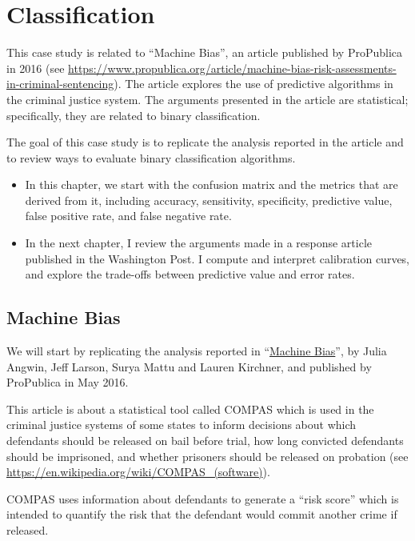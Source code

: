 \hypertarget{classification}{%
\chapter{Classification}\label{classification}}

This case study is related to ``Machine Bias'', an article published by
ProPublica in 2016 (see
\url{https://www.propublica.org/article/machine-bias-risk-assessments-in-criminal-sentencing}).
The article explores the use of predictive algorithms in the criminal
justice system. The arguments presented in the article are statistical;
specifically, they are related to binary classification.

The goal of this case study is to replicate the analysis reported in the
article and to review ways to evaluate binary classification algorithms.

\begin{itemize}
\item
  In this chapter, we start with the confusion matrix and the metrics
  that are derived from it, including accuracy, sensitivity,
  specificity, predictive value, false positive rate, and false negative
  rate.
\item
  In the next chapter, I review the arguments made in a response article
  published in the Washington Post. I compute and interpret calibration
  curves, and explore the trade-offs between predictive value and error
  rates.
\end{itemize}

\hypertarget{machine-bias}{%
\section{Machine Bias}\label{machine-bias}}

We will start by replicating the analysis reported in
``\protect\hyperlink{machine-bias}{Machine Bias}'', by Julia Angwin,
Jeff Larson, Surya Mattu and Lauren Kirchner, and published by
ProPublica in May 2016.

This article is about a statistical tool called COMPAS which is used in
the criminal justice systems of some states to inform decisions about
which defendants should be released on bail before trial, how long
convicted defendants should be imprisoned, and whether prisoners should
be released on probation (see
\url{https://en.wikipedia.org/wiki/COMPAS_(software)}).

COMPAS uses information about defendants to generate a ``risk score''
which is intended to quantify the risk that the defendant would commit
another crime if released.

